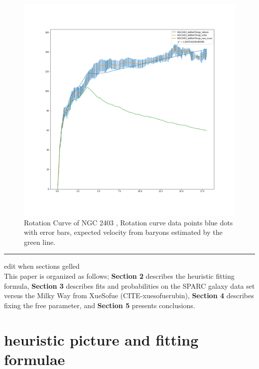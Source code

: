 \documentclass[reprint,%
 amsmath,amssymb,
 aps,
]{revtex4-1}
\begin{document}
 \begin{figure}[h!]
      \centering
      \includegraphics[width=\linewidth]{NGC2403_deBlokThings_XueSofue}
      \caption{Rotation Curve of NGC 2403 \cite{Blok1},  Rotation curve data points blue dots with  error bars, expected velocity from baryons estimated by the green line. }
      \label{fig:NGC2403}
  \end{figure}
  
       
  
 
 {\color{teal} \rule{\linewidth}{0.5mm}}
 {\color{teal} edit when sections gelled}\\
This paper  is organized as follows;
{\bf Section 2} describes the heuristic  fitting formula, 
{\bf Section 3} describes fits and probabilities on the
 SPARC galaxy data set versus    the Milky Way from  XueSofue (CITE-xuesofuerubin), 
 {\bf Section 4} describes fixing the free parameter,   and   
{\bf Section 5}  presents conclusions.     
  

   
 
   
 
 
 
  
 
\section{  heuristic picture and fitting formulae  \label{sec:dos}}
\end{document}
